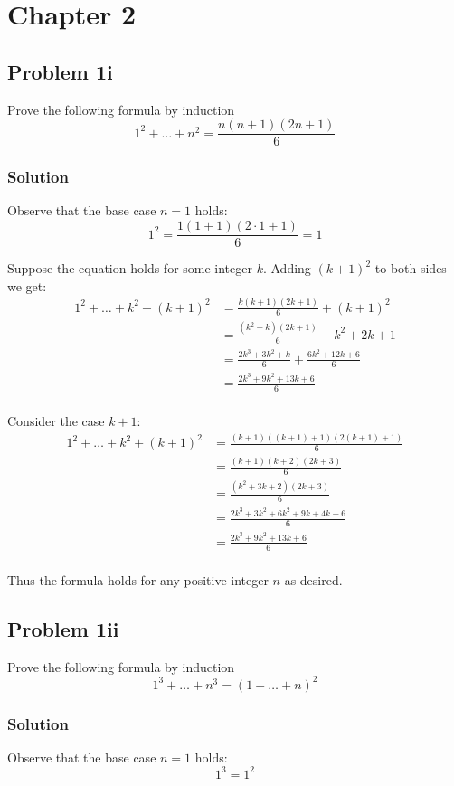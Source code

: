 \section{Chapter 2}
\subsection*{Problem 1i}
Prove the following formula by induction
\[1^2+\ldots+n^2=\frac{n(n+1)(2n+1)}{6}\]

\subsubsection*{Solution}
Observe that the base case $n=1$ holds:
\[1^2=\frac{1(1+1)(2\cdot1+1)}{6}=1\]

Suppose the equation holds for some integer $k$. Adding $(k+1)^2$ to both sides we get:
\begin{align*}
    1^2+\ldots+k^2+(k+1)^2&=\frac{k(k+1)(2k+1)}{6}+(k+1)^2\\
    &=\frac{(k^2+k)(2k+1)}{6}+k^2+2k+1\\
    &=\frac{2k^3+3k^2+k}{6}+\frac{6k^2+12k+6}{6}\\
    &=\frac{2k^3+9k^2+13k+6}{6}\\
\end{align*}

Consider the case $k+1$:
\begin{align*}
    1^2+\ldots+k^2+(k+1)^2&=\frac{(k+1)((k+1)+1)(2(k+1)+1)}{6}\\
    &=\frac{(k+1)(k+2)(2k+3)}{6}\\
    &=\frac{(k^2+3k+2)(2k+3)}{6}\\
    &=\frac{2k^3+3k^2+6k^2+9k+4k+6}{6}\\
    &=\frac{2k^3+9k^2+13k+6}{6}\\
\end{align*}

Thus the formula holds for any positive integer $n$ as desired.

\subsection*{Problem 1ii}
Prove the following formula by induction
\[1^3+\ldots+n^3=(1+\ldots+n)^2\]

\subsubsection*{Solution}
Observe that the base case $n=1$ holds:
\[1^3=1^2\]

